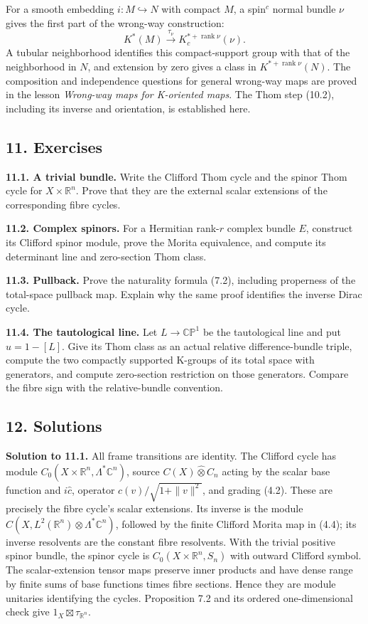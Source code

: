 \documentclass[
  11pt,
]{article}
\begin{document}
For a smooth embedding \(i:M\hookrightarrow N\) with compact \(M\), a
spin\(^{c}\) normal bundle \(\nu\) gives the first part of the wrong-way
construction: \[
K^*(M)\xrightarrow{\ \tau_\nu\ }
K_c^{*+\operatorname{rank}\nu}(\nu).
\tag{10.2}
\] A tubular neighborhood identifies this compact-support group with
that of the neighborhood in \(N\), and extension by zero gives a class
in \(K^{*+\operatorname{rank}\nu}(N)\). The composition and independence
questions for general wrong-way maps are proved in the lesson
\emph{Wrong-way maps for K-oriented maps}. The Thom step (10.2),
including its inverse and orientation, is established here.

\subsection{11. Exercises}\label{exercises}

\textbf{11.1. A trivial bundle.} Write the Clifford Thom cycle and the
spinor Thom cycle for \(X\times\mathbb R^n\). Prove that they are the
external scalar extensions of the corresponding fibre cycles.

\textbf{11.2. Complex spinors.} For a Hermitian rank-\(r\) complex
bundle \(E\), construct its Clifford spinor module, prove the Morita
equivalence, and compute its determinant line and zero-section Thom
class.

\textbf{11.3. Pullback.} Prove the naturality formula (7.2), including
properness of the total-space pullback map. Explain why the same proof
identifies the inverse Dirac cycle.

\textbf{11.4. The tautological line.} Let \(L\to\mathbb{CP}^1\) be the
tautological line and put \(u=1-[L]\). Give its Thom class as an actual
relative difference-bundle triple, compute the two compactly supported
K-groups of its total space with generators, and compute zero-section
restriction on those generators. Compare the fibre sign with the
relative-bundle convention.

\subsection{12. Solutions}\label{solutions}

\textbf{Solution to 11.1.} All frame transitions are identity. The
Clifford cycle has module
\(C_0(X\times\mathbb R^n,\Lambda^*\mathbb C^n)\), source
\(C(X)\widehat\otimes C_n\) acting by the scalar base function and
\(i\widehat c\), operator \(c(v)/\sqrt{1+\|v\|^2}\), and grading (4.2).
These are precisely the fibre cycle's scalar extensions. Its inverse is
the module \(C(X,L^2(\mathbb R^n)\otimes\Lambda^*\mathbb C^n)\),
followed by the finite Clifford Morita map in (4.4); its inverse
resolvents are the constant fibre resolvents. With the trivial positive
spinor bundle, the spinor cycle is \(C_0(X\times\mathbb R^n,S_n)\) with
outward Clifford symbol. The scalar-extension tensor maps preserve inner
products and have dense range by finite sums of base functions times
fibre sections. Hence they are module unitaries identifying the cycles.
Proposition 7.2 and its ordered one-dimensional check give
\(1_X\boxtimes\tau_{\mathbb R^n}\).
\end{document}
